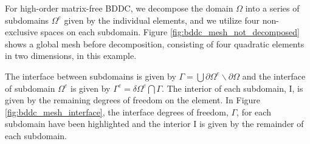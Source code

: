 For high-order matrix-free BDDC, we decompose the domain $\Omega$ into a series of subdomains $\Omega^e$ given by the individual elements, and we utilize four non-exclusive spaces on each subdomain.
Figure \ref{fig:bddc_mesh_not_decomposed} shows a global mesh before decomposition, consisting of four quadratic elements in two dimensions, in this example.

The interface between subdomains is given by $\Gamma = \bigcup \partial \Omega^e \backslash \partial \Omega$ and the interface of subdomain $\Omega^e$ is given by $\Gamma^e = \delta \Omega^e \bigcap \Gamma$.
The interior of each subdomain, $\text{I}$, is given by the remaining degrees of freedom on the element.
In Figure \ref{fig:bddc_mesh_interface}, the interface degrees of freedom, $\Gamma$, for each subdomain have been highlighted and the interior $\text{I}$ is given by the remainder of each subdomain.

